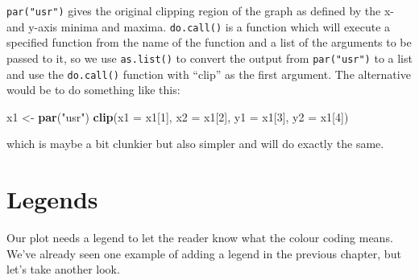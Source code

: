 \documentclass[
]{book}
\newenvironment{Shaded}{\begin{snugshade}}{\end{snugshade}}
\newcommand{\DataTypeTok}[1]{\textcolor[rgb]{0.13,0.29,0.53}{#1}}
\newcommand{\DecValTok}[1]{\textcolor[rgb]{0.00,0.00,0.81}{#1}}
\newcommand{\KeywordTok}[1]{\textcolor[rgb]{0.13,0.29,0.53}{\textbf{#1}}}
\newcommand{\NormalTok}[1]{#1}
\newcommand{\StringTok}[1]{\textcolor[rgb]{0.31,0.60,0.02}{#1}}
\begin{document}
\texttt{par("usr")} gives the original clipping region of the graph as defined by the x- and y-axis minima and maxima. \texttt{do.call()} is a function which will execute a specified function from the name of the function and a list of the arguments to be passed to it, so we use \texttt{as.list()} to convert the output from \texttt{par("usr")} to a list and use the \texttt{do.call()} function with ``clip'' as the first argument. The alternative would be to do something like this:

\begin{Shaded}
\begin{Highlighting}[]
\NormalTok{x1 <-}\StringTok{ }\KeywordTok{par}\NormalTok{(}\StringTok{"usr"}\NormalTok{)}
\KeywordTok{clip}\NormalTok{(}\DataTypeTok{x1 =}\NormalTok{ x1[}\DecValTok{1}\NormalTok{], }\DataTypeTok{x2 =}\NormalTok{ x1[}\DecValTok{2}\NormalTok{], }\DataTypeTok{y1 =}\NormalTok{ x1[}\DecValTok{3}\NormalTok{], }\DataTypeTok{y2 =}\NormalTok{ x1[}\DecValTok{4}\NormalTok{])}
\end{Highlighting}
\end{Shaded}

which is maybe a bit clunkier but also simpler and will do exactly the same.

\hypertarget{legends}{%
\section{Legends}\label{legends}}

Our plot needs a legend to let the reader know what the colour coding means. We've already seen one example of adding a legend in the previous chapter, but let's take another look.
\end{document}
